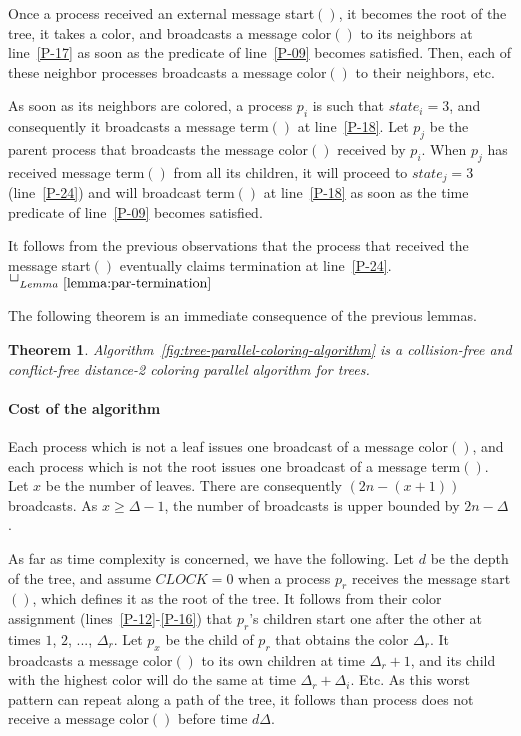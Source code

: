 \documentclass[11pt,english]{article}
\newcommand{\CLOCK}{\mathit{CLOCK}}
\newtheorem{theorem}{Theorem}
\newcommand{\toto}{xxx}
\newenvironment{proofL}{\noindent{\bf
Proof }} {\hspace*{\fill}$\Box_{Lemma~\ref{\toto}}$\par\vspace{3mm}}
\begin{document}
\begin{proofL}
Once a process received an external message {\sc start}$()$, 
it becomes the root of the tree, it takes a color, 
and broadcasts a message {\sc color}$()$
to its neighbors at line~\ref{P-17} as soon as the
predicate of line~\ref{P-09}  becomes satisfied. 
Then, each of these neighbor processes  broadcasts a 
message {\sc color}$()$ to their neighbors, etc. 

As soon as its neighbors are  colored, a process $p_i$ is such 
that $state_i=3$, and consequently it broadcasts a message 
{\sc term}$()$  at line~\ref{P-18}. 
Let  $p_j$ be the parent process that  broadcasts the message {\sc color}$()$ 
received by $p_i$. When $p_j$ has received message {\sc term}$()$ 
from all its children, it will proceed to $state_j=3$ (line~\ref{P-24}) 
and will broadcast {\sc term}$()$  at line~\ref{P-18} as soon as the 
time predicate of line~\ref{P-09} becomes satisfied. 

It follows from the previous observations that the process that received 
the message {\sc start}$()$ eventually claims termination at line~\ref{P-24}. 
\renewcommand{\toto}{lemma:par-termination}
\end{proofL}


\noindent
The following theorem is an immediate consequence of the previous lemmas. 
\begin{theorem}
\label{theo:parallel-coloring}
Algorithm~{\em\ref{fig:tree-parallel-coloring-algorithm}}
is a collision-free and conflict-free distance-2 coloring 
parallel algorithm for trees. 
\end{theorem}

\paragraph{Cost of the algorithm}
Each process which is not a leaf issues one broadcast of a message 
{\sc color}$()$, and each process which is not the root issues one 
broadcast of a message {\sc term}$()$. Let $x$ be the number of leaves.
There are consequently $(2n-(x+1))$ broadcasts.  As $x\geq\Delta -1$, 
the number of broadcasts is upper bounded by $2n-\Delta$.


As far as time complexity is concerned, we have the following.  Let
$d$ be the depth of the tree, and assume $\CLOCK=0$ when a process
$p_r$ receives the message {\sc start}$()$, which defines it as the 
root of the tree. It follows from their color assignment 
(lines~\ref{P-12}-\ref{P-16}) that $p_r$'s 
children start one after the other at times $1$, $2$, ..., $\Delta_r$.
Let $p_x$ be the child of $p_r$ that obtains the color $\Delta_r$.
It broadcasts a message  {\sc color}$()$ to its own children at time 
 $\Delta_r+1$, and its child with the highest color will 
do the same at time  $\Delta_r+\Delta_i$. Etc. 
As this worst pattern can repeat along a path of the tree, 
it follows than  process does not receive a message {\sc color}$()$ 
before time  $d\Delta$. 
\end{document}
